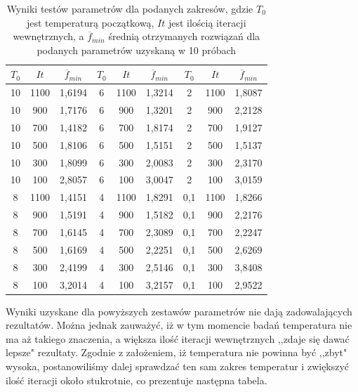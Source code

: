 \documentclass[twoside]{projektInzynierskiMS1}
\newcommand{\si}{ś}
\begin{document}
\begin{table}[htbp]\centering
\def\sym#1{\ifmmode^{#1}\else\(^{#1}\)\fi}
\caption{Wyniki testów parametrów dla podanych zakresów, gdzie $T_0$ jest temperaturą początkową, $It$ jest ilo\si cią iteracji wewnętrznych, a $\overline{f}_{min}$ \si rednią otrzymanych rozwiązań dla podanych parametrów uzyskaną w 10 próbach}
\begin{tabular}{|c|c|c||c|c|c||c|c|c|} 
                  \hline
                   $T_0$
                  & $It$
                  &$\overline{f}_{min}$ 
& $T_0$
 & $It$ 
 &$\overline{f}_{min}$ 
& $T_0$
& $It$
&$\overline{f}_{min}$ \\ \hline
10 & 1100 & 1,6194 &6 & 1100 & 1,3214 &2 & 1100 & 1,8087 \\ \hline 
10 & 900 & 1,7176 &6 & 900 & 1,3201 &2 & 900 & 2,2128 \\ \hline 
10 & 700 & 1,4182&6 & 700 & 1,8174 &2 & 700 & 1,9127 \\ \hline
10 & 500 & 1,8106&6 & 500 & 1,5151 &2 & 500 & 1,5137 \\ \hline  
10 & 300 & 1,8099 &6 & 300 & 2,0083 &2 & 300 & 2,3170 \\ \hline 
10 & 100 & 2,8057&6 & 100 & 3,0047 &2 & 100 & 3,0159 \\ \Xhline{3\arrayrulewidth}

8 & 1100 & 1,4151 &4 & 1100 & 1,8291 & 0,1 & 1100 & 1,8266 \\ \hline 
8 & 900 & 1,5191 & 4 & 900 & 1,5182 & 0,1 & 900 & 2,2176 \\ \hline 
8 & 700 & 1,6145 &4 & 700 & 2,3089 & 0,1 & 700 & 2,2247 \\ \hline 
8 & 500 & 1,6169 &4 & 500 & 2,2251 & 0,1 & 500 & 2,6269 \\ \hline 
8 & 300 & 2,4199 &4 & 300 & 2,5146& 0,1 & 300 & 3,8408 \\ \hline  
8 & 100 & 3,2014 &4 & 100 & 3,2157 & 0,1 & 100 & 2,9522 \\ \hline 
\end{tabular} 
\end{table}

Wyniki uzyskane dla powyższych zestawów parametrów nie dają zadowalających rezultatów. Można jednak zauważyć, iż w tym momencie badań temperatura nie ma aż takiego znaczenia, a większa ilo\si ć iteracji wewnętrznych ,,zdaje się dawać lepsze" rezultaty. Zgodnie z założeniem, iż temperatura nie powinna być ,,zbyt" wysoka, postanowili\si my dalej sprawdzać ten sam zakres temperatur i zwiększyć ilo\si ć iteracji około stukrotnie, co prezentuje następna tabela.
\end{document}

